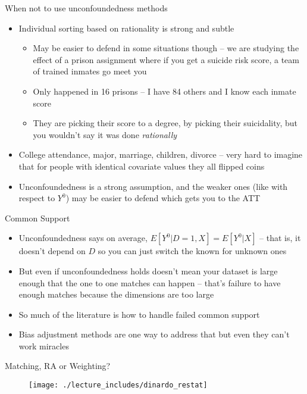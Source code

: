 \documentclass{beamer}
\begin{document}
\begin{frame}{When not to use unconfoundedness methods}

\begin{itemize}
\item Individual sorting based on rationality is strong and subtle
	\begin{itemize}
	\item May be easier to defend in some situations though -- we are studying the effect of a prison assignment where if you get a suicide risk score, a team of trained inmates go meet you
	\item Only happened in 16 prisons -- I have 84 others and I know each inmate score
	\item They are picking their score to a degree, by picking their suicidality, but you wouldn't say it was done \emph{rationally}
	\end{itemize}
\item College attendance, major, marriage, children, divorce -- very hard to imagine that for people with identical covariate values they all flipped coins
\item Unconfoundedness is a strong assumption, and the weaker ones (like with respect to $Y^0$) may be easier to defend which gets you to the ATT

\end{itemize}

\end{frame}  

\begin{frame}{Common Support}

\begin{itemize}
\item Unconfoundedness says on average, $E[Y^0|D=1,X]=E[Y^0|X]$ -- that is, it doesn't depend on $D$ so you can just switch the known for unknown ones
\item But even if unconfoundedness holds doesn't mean your dataset is large enough that the one to one matches can happen -- that's failure to have enough matches because the dimensions are too large
\item So much of the literature is how to handle failed common support
\item Bias adjustment methods are one way to address that but even they can't work miracles
\end{itemize}

\end{frame}


\begin{frame}{Matching, RA or Weighting?}


  \begin{figure}
    \texttt{[image: ./lecture\_includes/dinardo\_restat]}
  \end{figure}


\end{frame}
\end{document}
